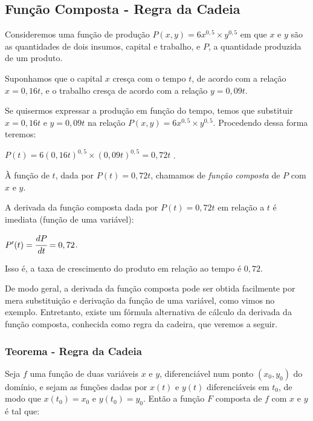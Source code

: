 	\subsection{Função Composta - Regra da Cadeia \cite{morettin}}

		Consideremos uma função de produção $P(x, y) = 6x^{0,5} \times y^{0,5}$ em que $x$ e $y$ são as quantidades de dois insumos, capital e trabalho, e $P$, a quantidade produzida de um produto.

		Suponhamos que o capital $x$ cresça com o tempo $t$, de acordo com a relação $x = 0,16t$, e o trabalho cresça de acordo com a relação $y = 0,09t$.

		Se quisermos expressar a produção em função do tempo, temos que substituir $x = 0,16t$ e $y = 0,09t$ na relação $P(x, y) = 6x^{0,5} \times y^{0,5}$. Procedendo dessa forma teremos:

		\medskip

		$P(t) = 6(0,16t)^{0,5} \times (0,09t)^{0,5} = 0,72t$ .

		\medskip

		À função de $t$, dada por $P(t) = 0,72t$, chamamos de \textit{função composta} de $P$ com $x$ e $y$.

		A derivada da função composta dada por $P(t) = 0,72t$ em relação a $t$ é imediata (função de uma variável):

		\medskip

		$P'(t) = \cfrac{dP}{dt} = 0,72$.

		\medskip

		Isso é, a taxa de crescimento do produto em relação ao tempo é $0,72$.

		De modo geral, a derivada da função composta pode ser obtida facilmente por mera substituição e derivação da função de uma variável, como vimos no exemplo. Entretanto, existe um fórmula alternativa de cálculo da derivada da função composta, conhecida como regra da cadeira, que veremos a seguir.

		\subsubsection{Teorema - Regra da Cadeia \cite{morettin}}

			Seja $f$ uma função de duas variáveis $x$ e $y$, diferenciável num ponto $(x_{0}, y_{0})$ do domínio, e sejam as funções dadas por $x(t)$ e $y(t)$ diferenciáveis em $t_{0}$, de modo que $x(t_{0}) = x_{0}$ e $y(t_{0}) = y_{0}$. Então a função $F$ composta de $f$ com $x$ e $y$ é tal que:

